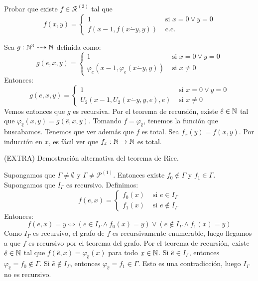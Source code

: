 \documentclass[twoside]{article}
\begin{document}
\newpage

\begin{ejercicio}{18}
Probar que existe $f \in \mathcal{R}^{(2)}$ tal que
\[ f(x,y) = \begin{cases}
	1 &\text{ si }x = 0 \lor y = 0\\
	f(x-1, f(x\dot{-}y,y)) &\text{ c.c.}	
\end{cases}\]
\end{ejercicio}
\begin{solucion}
Sea $g : \mathbb{N}^3 \dashrightarrow \mathbb{N}$ definida como:
\[ g(e,x,y) = \begin{cases}
	1 &\text{ si }x = 0 \lor y = 0\\
	φ_e(x-1,φ_e(x\dot{-}y,y)) & \text{ si }x \neq 0
\end{cases}\]
Entonces:
\[ g(e,x,y) = \begin{cases}
	1 &\text{ si }x = 0 \lor y = 0\\
	U_2(x-1,U_2(x\dot{-}y,y,e),e) & \text{ si }x \neq 0
\end{cases}\]
Vemos entonces que $g$ es recursiva. Por el teorema de recursión, existe $\hat{e} \in \mathbb{N}$ tal que $φ_{\hat{e}} (x,y) = g(\hat{e},x,y)$. Tomando $f = φ_{\hat{e}}$, tenemos la función que buscabamos. Tenemos que ver además que $f$ es total. Sea $f_x(y) = f(x,y)$. Por inducción en $x$, es fácil ver que $f_x : \mathbb{N} \to \mathbb{N}$ es total.
\end{solucion}
\newpage

\begin{ejercicio}{(EXTRA)}
Demostración alternativa del teorema de Rice.
\end{ejercicio}
\begin{solucion}
\end{solucion}
Supongamos que $Γ \neq \emptyset$ y $Γ \neq \mathcal{P}^{(1)}$. Entonces existe $f_0 \notin Γ$ y $f_1 \in Γ$. Supongamos que $I_Γ$ es recursivo. Definimos:
\[ f(e,x) = \begin{cases}
	f_0(x) &\text{ si }e \in I_Γ\\
	f_1(x) &\text{ si }e \notin I_Γ
\end{cases}\]
Entonces:
\[ f(e,x) = y \Leftrightarrow (e \in I_Γ \land f_0(x) = y) \lor (e \notin I_Γ \land f_1(x) = y) \]
Como $I_Γ$ es recursivo, el grafo de $f$ es recursivamente enumerable, luego llegamos a que $f$ es recursivo por el teorema del grafo. Por el teorema de recursión, existe $\hat{e} \in \mathbb{N}$ tal que $f(\hat{e},x) = φ_{\hat{e}}(x)$ para todo $x \in \mathbb{N}$. Si $\hat{e} \in I_Γ$, entonces $φ_{\hat{e}} = f_0 \notin Γ$. Si $\hat{e} \notin I_Γ$, entonces $φ_{\hat{e}} = f_1 \in Γ$. Esto es una contradicción, luego $I_Γ$ no es recursivo.
\end{document}
